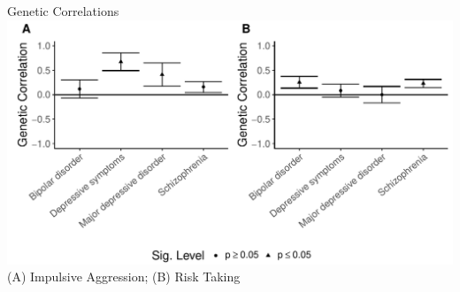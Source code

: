\documentclass{beamer}
\begin{document}
\begin{frame}[t]{Genetic Correlations}
  \tiny
  \includegraphics[width=0.99\linewidth]{../ukb_psychiatric/figures/combined_corr.pdf} \\
  (A) Impulsive Aggression; (B) Risk Taking
\end{frame}
\end{document}
